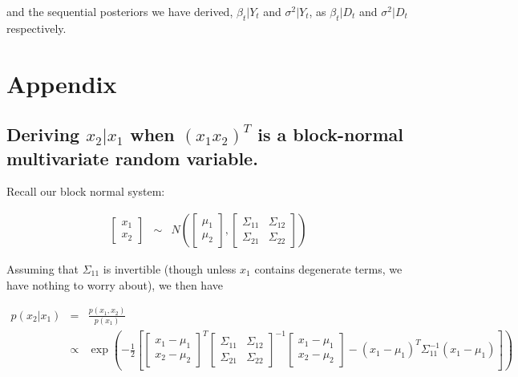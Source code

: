 \documentclass[
]{book}
\theoremstyle{definition}
\theoremstyle{definition}
\theoremstyle{definition}
\theoremstyle{definition}
\theoremstyle{remark}
\begin{document}
and the sequential posteriors we have derived, \(\beta_{t}\vert Y_{t}\) and \(\sigma^{2}\vert Y_{t}\), as \(\beta_{t}\vert D_{t}\) and \(\sigma^{2} \vert D_{t}\) respectively.

\hypertarget{appendix}{%
\section{Appendix}\label{appendix}}

\hypertarget{deriving-x_2-vert-x_1-when-x_1-x_2t-is-a-block-normal-multivariate-random-variable.}{%
\subsection{\texorpdfstring{Deriving \(x_{2} \vert x_{1}\) when \((x_{1} x_{2})^{T}\) is a block-normal multivariate random variable.}{Deriving x\_\{2\} \textbackslash vert x\_\{1\} when (x\_\{1\} x\_\{2\})\^{}\{T\} is a block-normal multivariate random variable.}}\label{deriving-x_2-vert-x_1-when-x_1-x_2t-is-a-block-normal-multivariate-random-variable.}}

Recall our block normal system:

\begin{eqnarray*}
\begin{bmatrix}x_{1}\\ x_{2}\end{bmatrix} &\sim& N\left(\begin{bmatrix}\mu_{1}\\ \mu_{2}\end{bmatrix}, \begin{bmatrix}\Sigma_{11} & \Sigma_{12}\\
\Sigma_{21} & \Sigma_{22}\end{bmatrix}\right)
\end{eqnarray*}

Assuming that \(\Sigma_{11}\) is invertible (though unless \(x_{1}\) contains degenerate terms, we have nothing to worry about), we then have

\begin{eqnarray*}
p(x_{2}\vert x_{1}) &=& \frac{p(x_{1},x_{2})}{p(x_{1})}\\
 &\propto& \exp\left(-\frac{1}{2}\left[\begin{bmatrix}x_{1} - \mu_{1}\\ x_{2} - \mu_{2}\end{bmatrix}^{T}\begin{bmatrix}\Sigma_{11} & \Sigma_{12}\\ \Sigma_{21} & \Sigma_{22}\end{bmatrix}^{-1}\begin{bmatrix}x_{1} - \mu_{1}\\ x_{2} - \mu_{2}\end{bmatrix} - (x_{1} - \mu_{1})^{T}\Sigma_{11}^{-1}(x_{1} - \mu_{1})\right]\right)
\end{eqnarray*}
\end{document}
